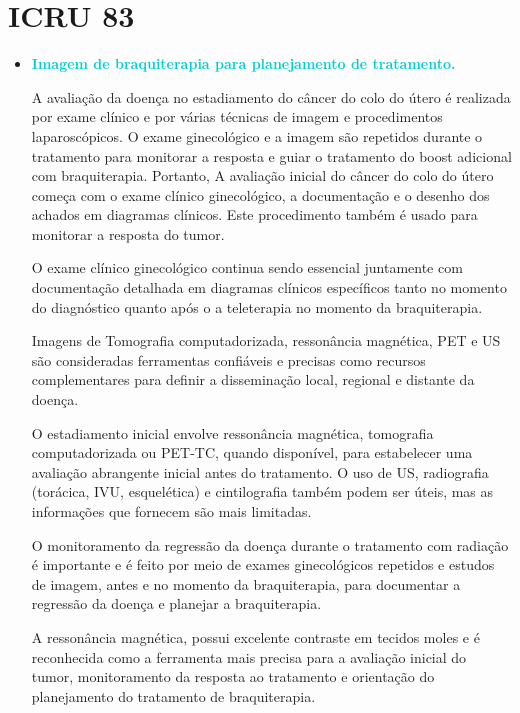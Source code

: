 \documentclass[11pt,a4paper]{article}
\newcounter{exemplo}
\begin{document}
\section{ICRU 83}

	\begin{exemplo}
		\begin{itemize}[label=\textcolor{CarnationPink}{$\blacksquare$}]
			\item \textcolor{DarkTurquoise}{\LobsterTwo\Large\textbf{Imagem de braquiterapia para planejamento de tratamento.}}
			
			A avaliação da doença no estadiamento do câncer do colo do útero é realizada por exame clínico e por várias técnicas de imagem e procedimentos laparoscópicos. O exame ginecológico e a imagem são repetidos durante o tratamento para monitorar a resposta e guiar o tratamento do boost adicional com braquiterapia. Portanto, A avaliação inicial do câncer do colo do útero começa com o exame clínico ginecológico, a documentação e o desenho dos achados em diagramas clínicos. Este procedimento também é usado para monitorar a resposta do tumor.

			O exame clínico ginecológico continua sendo essencial juntamente com documentação detalhada em diagramas clínicos específicos tanto no momento do diagnóstico quanto após o a teleterapia no momento da braquiterapia.

			Imagens de Tomografia computadorizada, ressonância magnética, PET e US são consideradas ferramentas confiáveis e precisas como recursos complementares para definir a disseminação local, regional e distante da doença.
			
			O estadiamento inicial envolve ressonância magnética, tomografia computadorizada ou PET-TC, quando disponível, para estabelecer uma avaliação abrangente inicial antes do tratamento. O uso de US, radiografia (torácica, IVU, esquelética) e cintilografia também podem ser úteis, mas as informações que fornecem são mais limitadas.


			O monitoramento da regressão da doença durante o tratamento com radiação é importante e é feito por meio de exames ginecológicos repetidos e estudos de imagem, antes e no momento da braquiterapia, para documentar a regressão da doença e planejar a braquiterapia.
			

			A ressonância magnética, possui excelente contraste em tecidos moles e é reconhecida como a ferramenta mais precisa para a avaliação inicial do tumor, monitoramento da resposta ao tratamento e orientação do planejamento do tratamento de braquiterapia. 


\end{itemize}
\end{exemplo}
\end{document}
